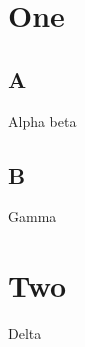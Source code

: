 \documentclass{book}
\begin{document}
\chapter{One}
\section{A}
Alpha beta
\section{B}
Gamma
\chapter{Two}
Delta
\printendnotes
\end{document}
